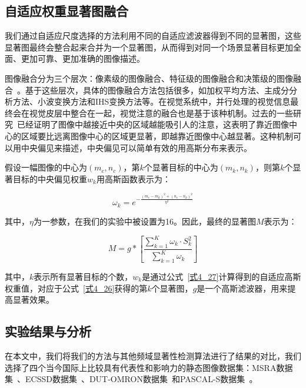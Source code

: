 \subsection{自适应权重显著图融合}
\label{4_2_3}

我们通过自适应尺度选择的方法利用不同的自适应滤波器得到不同的显著图，这些显著图最终会整合起来合并为一个显著图，从而得到对同一个场景显著目标更加全面、更加可靠、更加准确的图像描述。

图像融合分为三个层次：像素级的图像融合、特征级的图像融合和决策级的图像融合~\cite{吕超峰2007融合}。基于这些层次，具体的图像融合方法包括很多，如加权平均方法、主成分分析方法、小波变换方法和IHS变换方法等。在视觉系统中，并行处理的视觉信息最终会在视觉皮层中整合在一起，视觉注意的融合也是基于该种机制。过去的一些研究~\cite{JuddICCV2009Learning}已经证明了图像中越接近中央的区域越能吸引人的注意，这表明了靠近图像中心的区域要比远离图像中心的区域更显著，即越靠近图像中心越显著。这种机制可以用中央偏见来描述，中央偏见可以简单有效的用高斯分布来表示。

假设一幅图像的中心为$(m_{c},n_{c})$，第$k$个显著目标的中心为$(m_{k},n_{k})$，则第$k$个显著目标的中央偏见权重$w_{k}$用高斯函数表示为：
\begin{linenomath}
\begin{equation}
\omega_k=e^{-\frac{(m_{c}-m_{k})^{2}+(n_{c}-n_{k})^{2}}{\eta ^{2}}}
\label{式4_27}
\end{equation}
\end{linenomath}
其中，$\eta$为一参数，在我们的实验中被设置为16。因此，最终的显著图$M$表示为：
\begin{linenomath}
\begin{equation}
M=g\ast \left[\frac{\sum_{k=1}^{K}\omega_{k}\cdot S_{k}^{2}}{\sum_{k=1}^{K}\omega_{k}}\right]
\label{式4_28}
\end{equation}
\end{linenomath}
其中，$k$表示所有显著目标的个数，$w_{k}$是通过公式~\ref{式4_27}计算得到的自适应高斯权重值，对应于公式~\ref{式4_26}获得的第$k$个显著图，$g$是一个高斯滤波器，用来提高显著效果。

\subsection{实验结果与分析}
\label{4_2_4}

在本文中，我们将我们的方法与其他频域显著性检测算法进行了结果的对比，我们选择了四个当今国际上比较具有代表性和影响力的静态图像数据集：MSRA数据集~\cite{LiuTieCVPR2007Learning}、ECSSD数据集~\cite{YanQiongCVPR2013Hierarchical}、DUT-OMRON数据集~\cite{YangChuanCVPR2013Manifold}和PASCAL-S数据集~\cite{LiYinCVPR2014Secrets}。

